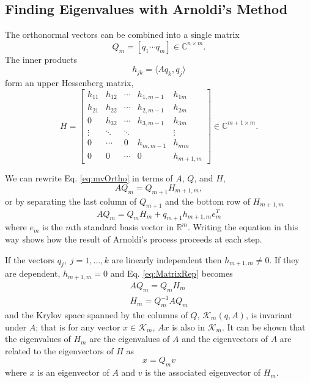 \documentclass[11pt]{article}
\begin{document}
\subsection{Finding Eigenvalues with Arnoldi's Method}
The orthonormal vectors can be combined into a single matrix
\begin{equation}
    Q_m = \left[q_1 \cdots q_m\right] \in \mathbb{C}^{n\times m}.
\end{equation}
The inner products 
\begin{equation}
    h_{jk} = \langle Aq_k, q_j\rangle
\end{equation}
form an upper Hessenberg matrix, 
\begin{equation}
    H = 
    \begin{bmatrix}
        h_{11} & h_{12} & \cdots & h_{1,m-1} & h_{1m} \\
        h_{21} & h_{22} & \cdots & h_{2,m-1} & h_{2m} \\
        0 & h_{32} & \cdots & h_{3,m-1} & h_{3m} \\
        \vdots & \ddots & \ddots & & \vdots \\
        0 & \cdots & 0 & h_{m,m-1} & h_{mm} \\
        0 & 0 & \cdots & 0 & h_{m+1,m}
    \end{bmatrix}
    \in \mathbb{C}^{m+1 \times m}.
\end{equation}

We can rewrite Eq. \ref{eq:mvOrtho} in terms of $A$, $Q$, and $H$,
\begin{equation}
    AQ_m = Q_{m+1}H_{m+1,m},    \label{eq:MatrixRep}
\end{equation}
or by separating the last column of $Q_{m+1}$ and the bottom row of $H_{m+1,m}$
\begin{equation}
    AQ_m = Q_{m}H_{m} + q_{m+1}h_{m+1,m}e_m^T   \label{eq:MRepmthIter}
\end{equation}
where $e_m$ is the $m$th standard basis vector in $\mathbb{R}^m$.  Writing the equation in this way shows how the result of Arnoldi's process proceeds at each step.

If the vectors $q_j, \;j = 1, \ldots, k$ are linearly independent then $h_{m+1,m} \neq 0$.  If they are dependent, $h_{m+1,m} = 0$ and Eq. \ref{eq:MatrixRep} becomes
\begin{subequations}\begin{gather}
    AQ_m = Q_mH_m \\
    H_m = Q_m^{-1}AQ_m
\end{gather}\end{subequations}
and the Krylov space spanned by the columns of $Q$, $\mathcal{K}_m(q,A)$, is invariant under $A$; that is for any vector $x \in \mathcal{K}_m$, $Ax$ is also in $\mathcal{K}_m$.  It can be shown that the eigenvalues of $H_m$ are the eigenvalues of $A$ and the eigenvectors of $A$ are related to the eigenvectors of $H$ as
\begin{equation}
    x = Q_mv
\end{equation}
where $x$ is an eigenvector of $A$ and $v$ is the associated eigenvector of $H_m$.  
\end{document}

